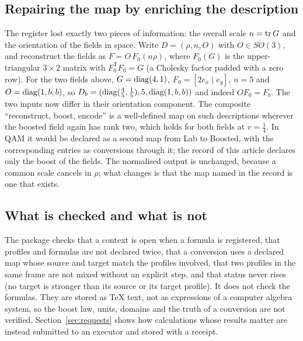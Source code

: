 \subsection{Repairing the map by enriching the description}

The register lost exactly two pieces of information: the overall scale $n=\operatorname{tr} G$ and the orientation of the fields in space. Write
$D=(\rho,n,O)$ with $O\in SO(3)$, and reconstruct the fields as $F=O\,F_0(n\rho)$, where $F_0(G)$ is the upper-triangular
$3\times2$ matrix with $F_0^{\mathsf T}F_0=G$ (a Cholesky factor padded with a zero row). For the two fields above,
$G=\operatorname{diag}(4,1)$, $F_0=[2e_x\mid e_y]$, $n=5$ and $O=\operatorname{diag}(1,b,b)$, so $D_b=(\operatorname{diag}(\frac45,\frac15),5,\operatorname{diag}(1,b,b))$ and indeed
$OF_0=F_b$. The two inputs now differ in their orientation component. The composite ``reconstruct, boost, encode'' is a well-defined
map on such descriptions wherever the boosted field again has rank two, which holds for both fields at $v=\frac14$. In QAM it would be
declared as a second map from Lab to Boosted, with the corresponding entries as conversions through it; the record of this article
declares only the boost of the fields. The normalised output is
unchanged, because a common scale cancels in $\rho$; what changes is that the map named in the record is one that exists.

\subsection{What is checked and what is not}

The package checks that a context is open when a formula is registered, that profiles and formulas are not declared twice, that a
conversion uses a declared map whose source and target match the profiles involved, that two profiles in the same frame are not mixed
without an explicit step, and that status never rises (no target is stronger than its source or its target profile). It does not check
the formulas. They are stored as \TeX{} text, not as expressions of a computer algebra system, so the boost law, units, domains and the
truth of a conversion are not verified. Section~\ref{sec:requests} shows how calculations whose results matter are instead submitted to
an executor and stored with a receipt.
